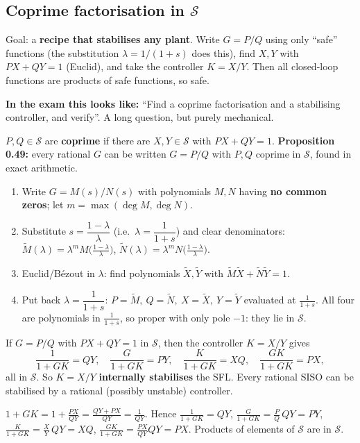 \subsection{Coprime factorisation in \texorpdfstring{$\mathcal S$}{S} \texorpdfstring{}{}}\label{sec:coprime}\label{ss:5-6}
\begin{plainbox}
Goal: a \textbf{recipe that stabilises any plant}. Write $G=P/Q$ using only ``safe'' functions (the substitution $\lambda=1/(1+s)$ does this),
find $X,Y$ with $PX+QY=1$ (Euclid), and take the controller $K=X/Y$. Then all closed-loop functions are products of safe functions, so safe.
\par\smallskip\textbf{In the exam this looks like:} ``Find a coprime factorisation and a stabilising controller, and verify''. A long question, but purely mechanical.
\end{plainbox}
\begin{defbox}
$P,Q\in\mathcal S$ are \textbf{coprime} if there are $X,Y\in\mathcal S$ with $PX+QY=1$.
\textbf{Proposition 0.49:} every rational $G$ can be written $G=P/Q$ with $P,Q$ coprime in $\mathcal S$, found in exact arithmetic.
\end{defbox}
\begin{methodbox}[title={The coprime factorisation algorithm (4 steps)}]
\begin{enumerate}
\item Write $G=M(s)/N(s)$ with polynomials $M,N$ having \textbf{no common zeros}; let $m=\max(\deg M,\deg N)$.
\item Substitute $s=\dfrac{1-\lambda}{\lambda}$ (i.e.\ $\lambda=\dfrac1{1+s}$) and clear denominators: $\tilde M(\lambda)=\lambda^mM\big(\frac{1-\lambda}\lambda\big)$, $\tilde N(\lambda)=\lambda^mN\big(\frac{1-\lambda}\lambda\big)$.
\item Euclid/B\'ezout in $\lambda$: find polynomials $\tilde X,\tilde Y$ with $\tilde M\tilde X+\tilde N\tilde Y=1$.
\item Put back $\lambda=\dfrac1{1+s}$: $P=\tilde M,\ Q=\tilde N,\ X=\tilde X,\ Y=\tilde Y$ evaluated at $\frac1{1+s}$. All four are polynomials in $\frac1{1+s}$, so proper with only pole $-1$: they lie in $\mathcal S$.
\end{enumerate}
\end{methodbox}
\begin{thmbox}[title={Proposition 0.50 and Theorem 0.52 (Youla)}]
If $G=P/Q$ with $PX+QY=1$ in $\mathcal S$, then the controller $\boxed{K=X/Y}$ gives
\[\frac{1}{1+GK}=QY,\quad\frac{G}{1+GK}=PY,\quad\frac{K}{1+GK}=XQ,\quad\frac{GK}{1+GK}=PX,\]
all in $\mathcal S$. So $K=X/Y$ \textbf{internally stabilises} the SFL. Every rational SISO can be stabilised by a rational (possibly unstable) controller.
\end{thmbox}
\begin{proofbox}[title={Proof (one line each)}]
$1+GK=1+\frac{PX}{QY}=\frac{QY+PX}{QY}=\frac1{QY}$. Hence $\frac1{1+GK}=QY$, $\frac{G}{1+GK}=\frac PQ\,QY=PY$, $\frac{K}{1+GK}=\frac XY\,QY=XQ$, $\frac{GK}{1+GK}=\frac{PX}{QY}QY=PX$.
Products of elements of $\mathcal S$ are in $\mathcal S$.
\end{proofbox}


